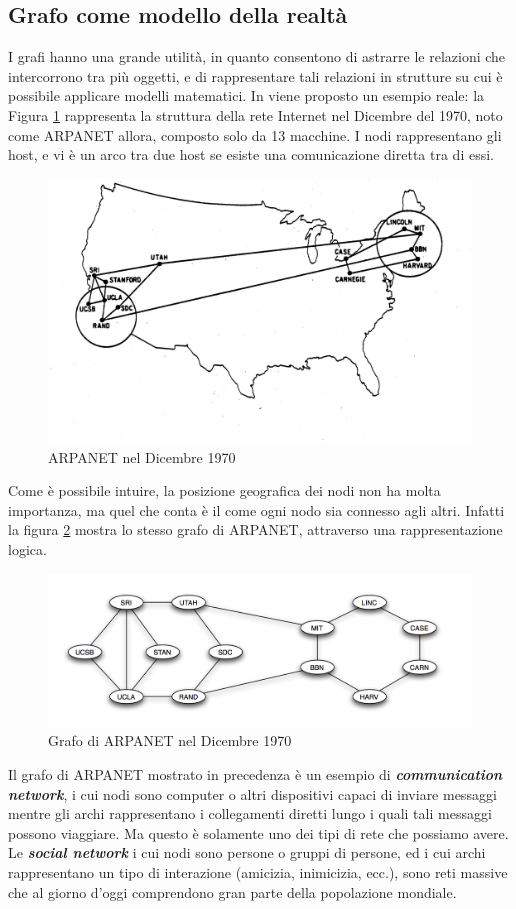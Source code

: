 \subsection{Grafo come modello della realtà}
I grafi hanno una grande utilità, in quanto consentono di astrarre le relazioni che intercorrono tra più oggetti, e di rappresentare tali relazioni in strutture su cui è possibile applicare modelli matematici. In \cite{easley2010networks} viene proposto un esempio reale: la Figura \ref{arpanet} rappresenta la struttura della rete Internet nel Dicembre del 1970, noto come ARPANET allora, composto solo da 13 macchine. I nodi rappresentano gli host, e vi è un arco tra due host se esiste una comunicazione diretta tra di essi.
\begin{figure}[h!]
	\centering
	\includegraphics[scale=.7]{img/arpanetdec1970.jpg}
	\caption{ARPANET nel Dicembre 1970}
	\label{arpanet}
\end{figure}
Come è possibile intuire, la posizione geografica dei nodi non ha molta importanza, ma quel che conta è il come ogni nodo sia connesso agli altri. Infatti la figura \ref{arpanet_graph} mostra lo stesso grafo di ARPANET, attraverso una rappresentazione logica.
\begin{figure}
	\centering
	\includegraphics[scale=.5]{img/arpanetdec1970_graph.png}
	\caption{Grafo di ARPANET nel Dicembre 1970}
	\label{arpanet_graph}
\end{figure}
Il grafo di ARPANET mostrato in precedenza è un esempio di \textit{\textbf{communication network}}, i cui nodi sono computer o altri dispositivi capaci di inviare messaggi mentre gli archi rappresentano i collegamenti diretti lungo i quali tali messaggi possono viaggiare. Ma questo è solamente uno dei tipi di rete che possiamo avere.\\
Le \textit{\textbf{social network}} i cui nodi sono persone o gruppi di persone, ed i cui archi rappresentano un tipo di interazione (amicizia, inimicizia, ecc.), sono reti massive che al giorno d'oggi comprendono gran parte della popolazione mondiale.
